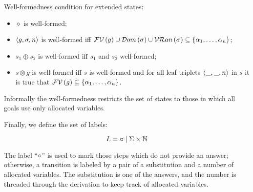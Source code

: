 \begin{definition}
  Well-formedness condition for extended states:
  
  \begin{itemize}
  \item $\diamond$ is well-formed;
  \item $\left<{g, \sigma, n}\right>$ is well-formed iff $\mathcal{FV}\,({g})\cup\mathcal{D}om\,({\sigma})\cup\mathcal{VR}an\,({\sigma})\subseteq\{\alpha_1,\dots,\alpha_n\}$;
  \item $s_1\oplus s_2$ is well-formed iff $s_1$ and $s_2$ well-formed;
  \item $s\otimes g$ is well-formed iff $s$ is well-formed and for all leaf triplets $\left<{\_,\_,n}\right>$ in $s$ it is true that $\mathcal{FV}\,({g})\subseteq\{\alpha_1,\dots,\alpha_n\}$.
  \end{itemize}
  
\end{definition}

Informally the well-formedness restricts the set of states to those in which all goals use only allocated variables.

Finally, we define the set of labels:

\[
L = \circ \mid \Sigma\times \mathbb{N}
\]

The label ``$\circ$'' is used to mark those steps which do not provide an answer; otherwise, a transition is labeled by a pair of a substitution and a number of allocated
variables. The substitution is one of the answers, and the number is threaded through the derivation to keep track of allocated variables.

